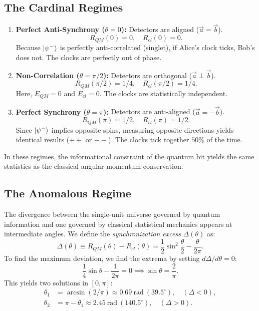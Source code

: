 \documentclass[entropy,article,submit,moreauthors,pdftex]{Definitions/mdpi}
\begin{document}
\subsection{The Cardinal Regimes}
\begin{enumerate}
    \item \textbf{Perfect Anti-Synchrony ($\theta=0$):} Detectors are aligned ($\vec{a} = \vec{b}$).
    \[
    R_{QM}(0) = 0, \quad R_{cl}(0) = 0.
    \]
    Because $\ket{\psi^-}$ is perfectly anti-correlated (singlet), if Alice's clock ticks, Bob's does not. The clocks are perfectly out of phase.

    \item \textbf{Non-Correlation ($\theta=\pi/2$):} Detectors are orthogonal ($\vec{a} \perp \vec{b}$).
    \[
    R_{QM}(\pi/2) = 1/4, \quad R_{cl}(\pi/2) = 1/4.
    \]
    Here, $E_{QM} = 0$ and $E_{cl} = 0$. The clocks are statistically independent.

    \item \textbf{Perfect Synchrony ($\theta=\pi$):} Detectors are anti-aligned ($\vec{a} = -\vec{b}$).
    \[
    R_{QM}(\pi) = 1/2, \quad R_{cl}(\pi) = 1/2.
    \]
    Since $\ket{\psi^-}$ implies opposite spins, measuring opposite directions yields identical results ($++$ or $--$). The clocks tick together $50\%$ of the time.
\end{enumerate}
In these regimes, the informational constraint of the quantum bit yields the same statistics as the classical angular momentum conservation.

\subsection{The Anomalous Regime}

The divergence between the single-unit universe governed by quantum information and one governed by classical statistical mechanics appears at intermediate angles. We define the \emph{synchronization excess} $\Delta(\theta)$ as:
\begin{equation}
\Delta(\theta) \equiv R_{QM}(\theta) - R_{cl}(\theta) = \frac{1}{2}\sin^2\frac{\theta}{2} - \frac{\theta}{2\pi}.
\end{equation}
To find the maximum deviation, we find the extrema by setting $d\Delta/d\theta = 0$:
\begin{equation}
\frac{1}{4}\sin\theta - \frac{1}{2\pi} = 0 \implies \sin\theta = \frac{2}{\pi}.
\end{equation}
This yields two solutions in $[0, \pi]$:
\begin{align}
\theta_1 &= \arcsin(2/\pi) \approx 0.69~\text{rad}~(39.5^\circ), \quad (\Delta < 0), \\
\theta_2 &= \pi - \theta_1 \approx 2.45~\text{rad}~(140.5^\circ), \quad (\Delta > 0).
\end{align}
\end{document}
